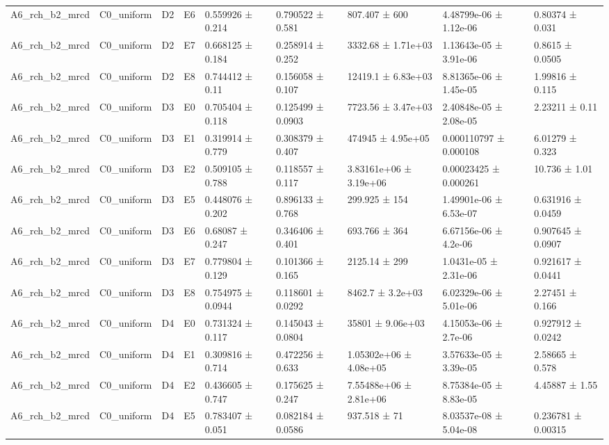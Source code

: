 \begin{table}
\begin{tabular}{lllllllll}
A6\_rch\_b2\_mrcd & C0\_uniform & D2 & E6 & 0.559926 ± 0.214 & 0.790522 ± 0.581 & 807.407 ± 600 & 4.48799e-06 ± 1.12e-06 & 0.80374 ± 0.031 \\
A6\_rch\_b2\_mrcd & C0\_uniform & D2 & E7 & 0.668125 ± 0.184 & 0.258914 ± 0.252 & 3332.68 ± 1.71e+03 & 1.13643e-05 ± 3.91e-06 & 0.8615 ± 0.0505 \\
A6\_rch\_b2\_mrcd & C0\_uniform & D2 & E8 & 0.744412 ± 0.11 & 0.156058 ± 0.107 & 12419.1 ± 6.83e+03 & 8.81365e-06 ± 1.45e-05 & 1.99816 ± 0.115 \\
A6\_rch\_b2\_mrcd & C0\_uniform & D3 & E0 & 0.705404 ± 0.118 & 0.125499 ± 0.0903 & 7723.56 ± 3.47e+03 & 2.40848e-05 ± 2.08e-05 & 2.23211 ± 0.11 \\
A6\_rch\_b2\_mrcd & C0\_uniform & D3 & E1 & 0.319914 ± 0.779 & 0.308379 ± 0.407 & 474945 ± 4.95e+05 & 0.000110797 ± 0.000108 & 6.01279 ± 0.323 \\
A6\_rch\_b2\_mrcd & C0\_uniform & D3 & E2 & 0.509105 ± 0.788 & 0.118557 ± 0.117 & 3.83161e+06 ± 3.19e+06 & 0.00023425 ± 0.000261 & 10.736 ± 1.01 \\
A6\_rch\_b2\_mrcd & C0\_uniform & D3 & E5 & 0.448076 ± 0.202 & 0.896133 ± 0.768 & 299.925 ± 154 & 1.49901e-06 ± 6.53e-07 & 0.631916 ± 0.0459 \\
A6\_rch\_b2\_mrcd & C0\_uniform & D3 & E6 & 0.68087 ± 0.247 & 0.346406 ± 0.401 & 693.766 ± 364 & 6.67156e-06 ± 4.2e-06 & 0.907645 ± 0.0907 \\
A6\_rch\_b2\_mrcd & C0\_uniform & D3 & E7 & 0.779804 ± 0.129 & 0.101366 ± 0.165 & 2125.14 ± 299 & 1.0431e-05 ± 2.31e-06 & 0.921617 ± 0.0441 \\
A6\_rch\_b2\_mrcd & C0\_uniform & D3 & E8 & 0.754975 ± 0.0944 & 0.118601 ± 0.0292 & 8462.7 ± 3.2e+03 & 6.02329e-06 ± 5.01e-06 & 2.27451 ± 0.166 \\
A6\_rch\_b2\_mrcd & C0\_uniform & D4 & E0 & 0.731324 ± 0.117 & 0.145043 ± 0.0804 & 35801 ± 9.06e+03 & 4.15053e-06 ± 2.7e-06 & 0.927912 ± 0.0242 \\
A6\_rch\_b2\_mrcd & C0\_uniform & D4 & E1 & 0.309816 ± 0.714 & 0.472256 ± 0.633 & 1.05302e+06 ± 4.08e+05 & 3.57633e-05 ± 3.39e-05 & 2.58665 ± 0.578 \\
A6\_rch\_b2\_mrcd & C0\_uniform & D4 & E2 & 0.436605 ± 0.747 & 0.175625 ± 0.247 & 7.55488e+06 ± 2.81e+06 & 8.75384e-05 ± 8.83e-05 & 4.45887 ± 1.55 \\
A6\_rch\_b2\_mrcd & C0\_uniform & D4 & E5 & 0.783407 ± 0.051 & 0.082184 ± 0.0586 & 937.518 ± 71 & 8.03537e-08 ± 5.04e-08 & 0.236781 ± 0.00315 \\

\end{tabular}
\end{table}
